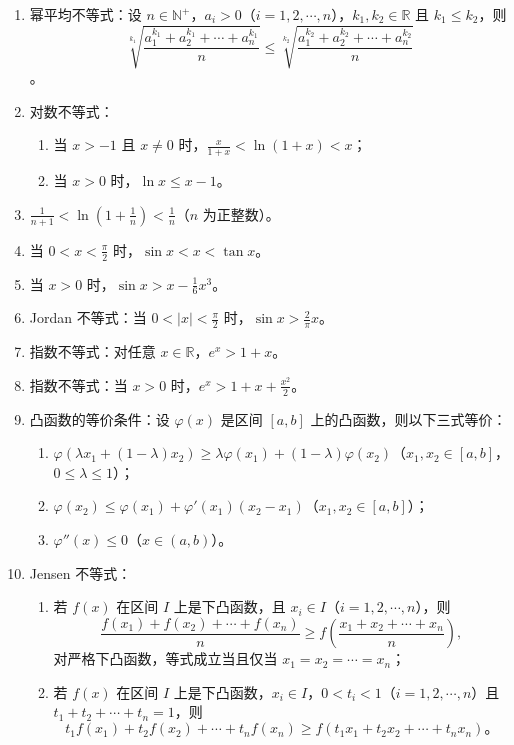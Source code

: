 \documentclass[UTF8]{ctexart}
\theoremstyle{remark}
\begin{document}
\begin{enumerate}
		
		\item 幂平均不等式：设 \(n \in \mathbb{N}^+\)，\(a_i > 0\)（\(i = 1, 2, \cdots, n\)），\(k_1, k_2 \in \mathbb{R}\) 且 \(k_1 \leq k_2\)，则
		\[
		\sqrt[k_1]{\frac{a_1^{k_1} + a_2^{k_1} + \cdots + a_n^{k_1}}{n}} \leq \sqrt[k_2]{\frac{a_1^{k_2} + a_2^{k_2} + \cdots + a_n^{k_2}}{n}}
		\]。
		
		\item 对数不等式：
		\begin{enumerate}
			\item 当 \(x > -1\) 且 \(x \neq 0\) 时，\(\frac{x}{1 + x} < \ln(1 + x) < x\)；
			\item 当 \(x > 0\) 时，\(\ln x \leq x - 1\)。
		\end{enumerate}
		
		\item \(\frac{1}{n + 1} < \ln\left(1 + \frac{1}{n}\right) < \frac{1}{n}\)（\(n\) 为正整数）。
		
		\item 当 \(0 < x < \frac{\pi}{2}\) 时，\(\sin x < x < \tan x\)。
		
		\item 当 \(x > 0\) 时，\(\sin x > x - \frac{1}{6}x^3\)。
		
		\item Jordan 不等式：当 \(0 < |x| < \frac{\pi}{2}\) 时，\(\sin x > \frac{2}{\pi}x\)。
		
		\item 指数不等式：对任意 \(x \in \mathbb{R}\)，\(e^x > 1 + x\)。
		
		\item 指数不等式：当 \(x > 0\) 时，\(e^x > 1 + x + \frac{x^2}{2}\)。
		
		\item 凸函数的等价条件：设 \(\varphi(x)\) 是区间 \([a, b]\) 上的凸函数，则以下三式等价：
		\begin{enumerate}
			\item \(\varphi(\lambda x_1 + (1 - \lambda)x_2) \geq \lambda\varphi(x_1) + (1 - \lambda)\varphi(x_2)\)（\(x_1, x_2 \in [a, b]\)，\(0 \leq \lambda \leq 1\)）；
			\item \(\varphi(x_2) \leq \varphi(x_1) + \varphi'(x_1)(x_2 - x_1)\)（\(x_1, x_2 \in [a, b]\)）；
			\item \(\varphi''(x) \leq 0\)（\(x \in (a, b)\)）。
		\end{enumerate}
		
		\item Jensen 不等式：
		\begin{enumerate}
			\item 若 \(f(x)\) 在区间 \(I\) 上是下凸函数，且 \(x_i \in I\)（\(i = 1, 2, \cdots, n\)），则
			\[
			\frac{f(x_1) + f(x_2) + \cdots + f(x_n)}{n} \geq f\left(\frac{x_1 + x_2 + \cdots + x_n}{n}\right),
			\]
			对严格下凸函数，等式成立当且仅当 \(x_1 = x_2 = \cdots = x_n\)；
			\item 若 \(f(x)\) 在区间 \(I\) 上是下凸函数，\(x_i \in I\)，\(0 < t_i < 1\)（\(i = 1, 2, \cdots, n\)）且 \(t_1 + t_2 + \cdots + t_n = 1\)，则
			\[
			t_1f(x_1) + t_2f(x_2) + \cdots + t_nf(x_n) \geq f(t_1x_1 + t_2x_2 + \cdots + t_nx_n)。
			\]
		\end{enumerate}
		

\end{enumerate}
\end{document}
